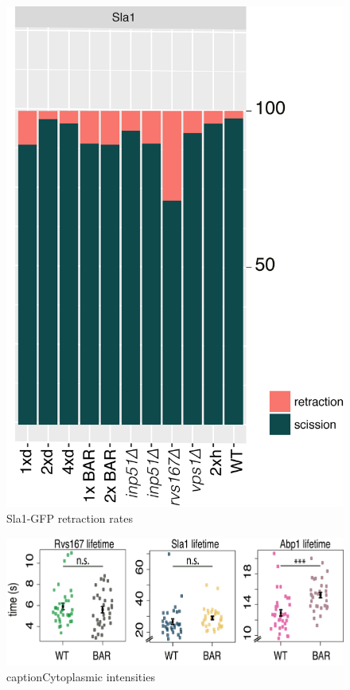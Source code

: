 \label{Ch:Appendix}

\begin{figure}[H]
\includegraphics[scale=1.5]{figures/appendix/retraction_rates_all}
\caption{Sla1-GFP retraction rates}
\end{figure}


\begin{figure}[H]
	\includegraphics[scale=0.6]{figures/appendix/delsh3_5}
	caption{Cytoplasmic intensities}
\end{figure}